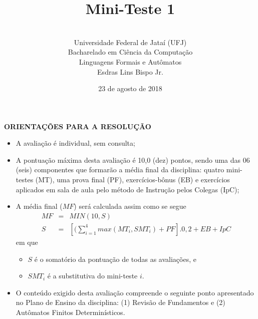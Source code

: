 \documentclass[12pt,a4paper,oneside]{article}
\author{\\Universidade Federal de Jataí (UFJ)\\Bacharelado em Ciência da Computação \\Linguagens Formais e Autômatos \\Esdras Lins Bispo Jr.}
\date{23 de agosto de 2018}
\title{\sc \huge Mini-Teste 1}
\begin{document}
\maketitle

{\bf ORIENTAÇÕES PARA A RESOLUÇÃO}

\small
 
\begin{itemize}
	\item A avaliação é individual, sem consulta;
	\item A pontuação máxima desta avaliação é 10,0 (dez) pontos, sendo uma das 06 (seis) componentes que formarão a média final da disciplina: quatro mini-testes (MT), uma prova final (PF), exercícios-bônus (EB) e exercícios aplicados em sala de aula pelo método de Instrução pelos Colegas (IpC);
	\item A média final ($MF$) será calculada assim como se segue
	\begin{eqnarray}
		MF & = & MIN(10, S) \nonumber \\
		S & = & [(\sum_{i=1}^{4} max(MT_i, SMT_i ) + PF].0,2  + EB + IpC\nonumber
	\end{eqnarray}
	em que 
	\begin{itemize}
		\item $S$ é o somatório da pontuação de todas as avaliações, e
		\item $SMT_i$ é a substitutiva do mini-teste $i$.
	\end{itemize}
	\item O conteúdo exigido desta avaliação compreende o seguinte ponto apresentado no Plano de Ensino da disciplina: (1) Revisão de Fundamentos e (2) Autômatos Finitos Determinísticos.
\end{itemize}

\begin{center}
\end{center}

\newpage
\end{document}

